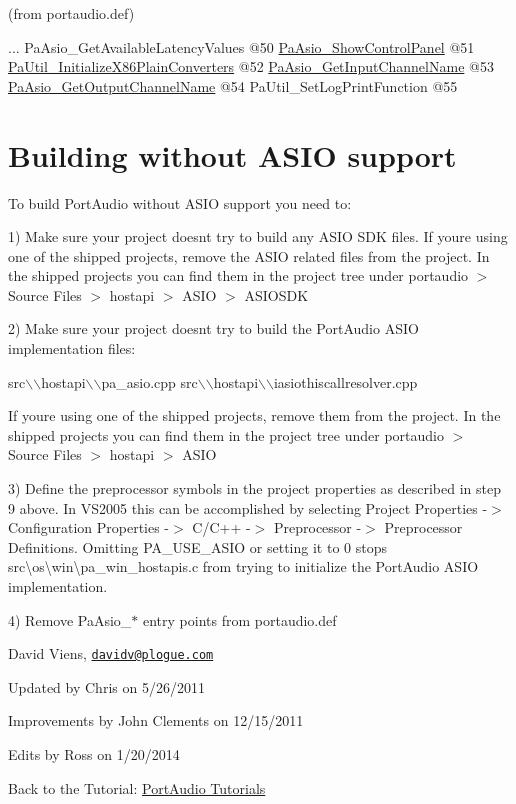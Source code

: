 (from portaudio.\+def) 
\begin{DoxyCode}
...
PaAsio\_GetAvailableLatencyValues    @50
\hyperlink{pa__asio_8h_ac9449ca8f0aedaa7b93027cdca3d6ba3}{PaAsio\_ShowControlPanel}             @51
\hyperlink{pa__x86__plain__converters_8c_ad8175335f0e2c18b66ae970ed52fdf59}{PaUtil\_InitializeX86PlainConverters} @52
\hyperlink{pa__asio_8h_abaafacb711225e7c6158fff3b3e8b87a}{PaAsio\_GetInputChannelName}          @53
\hyperlink{pa__asio_8h_a97bd5b2192c1321a492ba24d7ef843fa}{PaAsio\_GetOutputChannelName}         @54
PaUtil\_SetLogPrintFunction          @55
\end{DoxyCode}
\hypertarget{compile_windows_comp_win4}{}\section{Building without A\+S\+I\+O support}\label{compile_windows_comp_win4}
To build Port\+Audio without A\+S\+IO support you need to\+:

1) Make sure your project doesn\textquotesingle{}t try to build any A\+S\+IO S\+DK files. If you\textquotesingle{}re using one of the shipped projects, remove the A\+S\+IO related files from the project. In the shipped projects you can find them in the project tree under portaudio $>$ Source Files $>$ hostapi $>$ A\+S\+IO $>$ A\+S\+I\+O\+S\+DK

2) Make sure your project doesn\textquotesingle{}t try to build the Port\+Audio A\+S\+IO implementation files\+:


\begin{DoxyCode}
src\(\backslash\)\(\backslash\)hostapi\(\backslash\)\(\backslash\)pa\_asio.cpp
src\(\backslash\)\(\backslash\)hostapi\(\backslash\)\(\backslash\)iasiothiscallresolver.cpp
\end{DoxyCode}


If you\textquotesingle{}re using one of the shipped projects, remove them from the project. In the shipped projects you can find them in the project tree under portaudio $>$ Source Files $>$ hostapi $>$ A\+S\+IO

3) Define the preprocessor symbols in the project properties as described in step 9 above. In V\+S2005 this can be accomplished by selecting Project Properties -\/$>$ Configuration Properties -\/$>$ C/\+C++ -\/$>$ Preprocessor -\/$>$ Preprocessor Definitions. Omitting P\+A\+\_\+\+U\+S\+E\+\_\+\+A\+S\+IO or setting it to 0 stops src\textbackslash{}os\textbackslash{}win\textbackslash{}pa\+\_\+win\+\_\+hostapis.\+c from trying to initialize the Port\+Audio A\+S\+IO implementation.

4) Remove Pa\+Asio\+\_\+$\ast$ entry points from portaudio.\+def



 David Viens, \href{mailto:davidv@plogue.com}{\tt davidv@plogue.\+com}

Updated by Chris on 5/26/2011

Improvements by John Clements on 12/15/2011

Edits by Ross on 1/20/2014

Back to the Tutorial\+: \hyperlink{tutorial_start}{Port\+Audio Tutorials} 